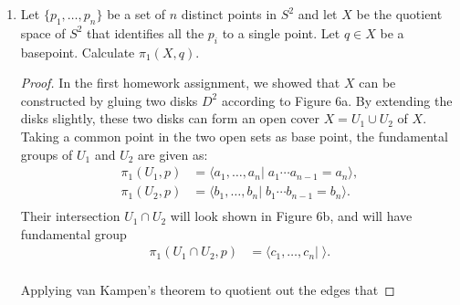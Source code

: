 \documentclass{article}
\begin{document}
\begin{enumerate}[label={\bf Q\arabic*:}]
  \item Let $\{p_1,\ldots,p_n\}$ be a set of $n$ distinct points in $S^2$
    and let $X$ be the quotient space of $S^2$ that identifies all the
    $p_i$ to a single point. Let $q\in X$ be a basepoint. Calculate
    $\pi_1(X,q)$.

    \begin{proof}
      In the first homework assignment, we showed that $X$ can be
      constructed by gluing two disks $D^2$ according to Figure 6a. By
      extending the disks slightly, these two disks can form an open cover
      $X=U_1\cup U_2$ of $X$. Taking a common point in the two open sets as
      base point, the fundamental groups of $U_1$ and $U_2$ are given as:
      \begin{align*}
        \pi_1(U_1,p) &= \langle a_1,\ldots,a_n|\; a_1\cdots
          a_{n-1}=a_n\rangle, \\
        \pi_1(U_2,p) &= \langle b_1,\ldots,b_n|\; b_1\cdots
          b_{n-1}=b_n\rangle. \\
      \end{align*}
      Their intersection $U_1\cap U_2$ will look shown in Figure 6b, and
      will have fundamental group 
      \begin{align*}
        \pi_1(U_1\cap U_2,p) &= \langle c_1,\ldots,c_n|\; \rangle. \\
      \end{align*}

      Applying van Kampen's theorem to quotient out the edges that 
    \end{proof}
\end{enumerate}
\end{document}
